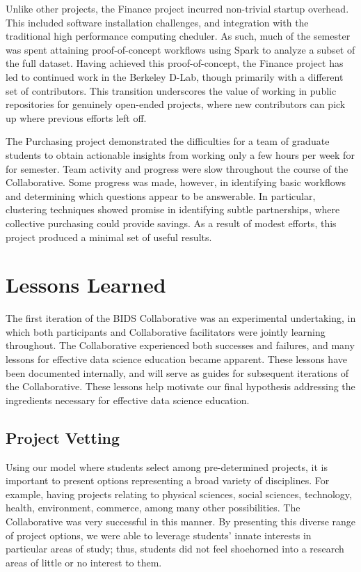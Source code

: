 \documentclass[12pt]{article}
\begin{document}
Unlike other projects, the Finance project incurred non-trivial startup overhead.  This included software installation challenges, and integration with the traditional high performance computing cheduler. As such, much of the semester was spent attaining proof-of-concept workflows using Spark to analyze a subset of the full dataset.  Having achieved this proof-of-concept, the Finance project has led to continued work in the Berkeley D-Lab, though primarily with a different set of contributors. This transition underscores the value of working in public repositories for genuinely open-ended projects, where new contributors can pick up where previous efforts left off.

The Purchasing project demonstrated the difficulties for a team of graduate students to obtain actionable insights from working only a few hours per week for for semester.  Team activity and progress were slow throughout the course of the Collaborative.  Some progress was made, however, in identifying basic workflows and determining which questions appear to be answerable. In particular, clustering techniques showed promise in identifying subtle partnerships, where collective purchasing could provide savings.  As a result of modest efforts, this project produced a minimal set of useful results.



\section{Lessons Learned}

The first iteration of the BIDS Collaborative was an experimental undertaking, in which both participants and Collaborative facilitators were jointly learning throughout.  The Collaborative experienced both successes and failures, and many lessons for effective data science education became apparent.  These lessons have been documented internally, and will serve as guides for subsequent iterations of the Collaborative. These lessons help motivate our final hypothesis addressing the ingredients necessary for effective data science education.

\subsection{Project Vetting}

Using our model where students select among pre-determined projects, it is important to present options representing a broad variety of disciplines.  For example, having projects relating to physical sciences, social sciences, technology, health, environment, commerce, among many other possibilities.  The Collaborative was very successful in this manner.  By presenting this diverse range of project options, we were able to leverage students' innate interests in particular areas of study; thus, students did not feel shoehorned into a research areas of little or no interest to them.
\end{document}
